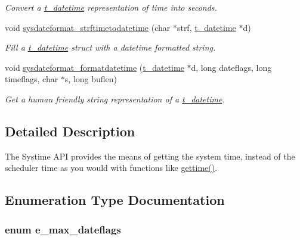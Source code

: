 \begin{DoxyCompactItemize}
\begin{DoxyCompactList}\small\item\em Convert a \hyperlink{structt__datetime}{t\_\-datetime} representation of time into seconds. \item\end{DoxyCompactList}\item 
void \hyperlink{group__systime_ga18e6eef81290f753a997dd6d0019ab60}{sysdateformat\_\-strftimetodatetime} (char $\ast$strf, \hyperlink{structt__datetime}{t\_\-datetime} $\ast$d)
\begin{DoxyCompactList}\small\item\em Fill a \hyperlink{structt__datetime}{t\_\-datetime} struct with a datetime formatted string. \item\end{DoxyCompactList}\item 
void \hyperlink{group__systime_ga6219d6f6543e65431086c34c35199e82}{sysdateformat\_\-formatdatetime} (\hyperlink{structt__datetime}{t\_\-datetime} $\ast$d, long dateflags, long timeflags, char $\ast$s, long buflen)
\begin{DoxyCompactList}\small\item\em Get a human friendly string representation of a \hyperlink{structt__datetime}{t\_\-datetime}. \item\end{DoxyCompactList}\end{DoxyCompactItemize}


\subsection{Detailed Description}
The Systime API provides the means of getting the system time, instead of the scheduler time as you would with functions like \hyperlink{group__clocks_gabe5d8b1c9f260d13734a328b2a60ff69}{gettime()}. 

\subsection{Enumeration Type Documentation}
\hypertarget{group__systime_ga26a8d02aa000843530dcb2d350766951}{
\subsubsection[{e\_\-max\_\-dateflags}]{\setlength{\rightskip}{0pt plus 5cm}enum {\bf e\_\-max\_\-dateflags}}}
\label{group__systime_ga26a8d02aa000843530dcb2d350766951}


